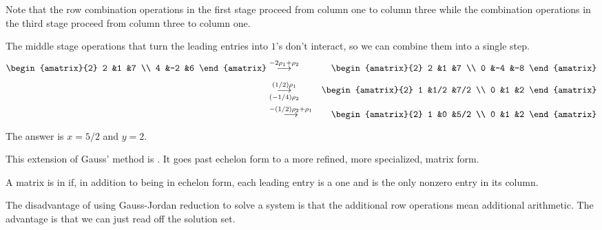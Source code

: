Note that the row combination operations in the first stage proceed from column
one to column three while the combination operations in the third stage proceed 
from column three to column one.

\begin{example}
The middle stage operations that 
turn the leading entries into \( 1 \)'s
don't interact, so we can combine them into a single step.
\begin{eqnarray*}
    \begin{amatrix}{2}
       2   &1   &7   \\
       4   &-2  &6
    \end{amatrix}
  &\grstep{-2\rho_1+\rho_2}
  &\begin{amatrix}{2}
       2   &1   &7   \\
       0   &-4  &-8
    \end{amatrix}                                   \\
  &\grstep[(-1/4)\rho_2]{(1/2)\rho_1}
  &\begin{amatrix}{2}
       1   &1/2   &7/2   \\
       0   &1     &2
    \end{amatrix}                                    \\
  &\grstep{-(1/2)\rho_2+\rho_1}
  &\begin{amatrix}{2}
       1   &0   &5/2   \\
       0   &1   &2
    \end{amatrix}
\end{eqnarray*}
The answer is $x=5/2$ and $y=2$.
\end{example}

This extension of Gauss' method is 
.
It goes past echelon form to a more refined, more specialized,
matrix form.

\begin{definition}\label{def:RedEchForm}
A matrix is in
if, in addition to being in echelon form, each leading entry is a
one and is the only nonzero entry in its column.
\end{definition}

\noindent
The disadvantage of using Gauss-Jordan reduction to solve a system is that
the additional row operations mean additional arithmetic.
The advantage is that we can just read off the solution set.

